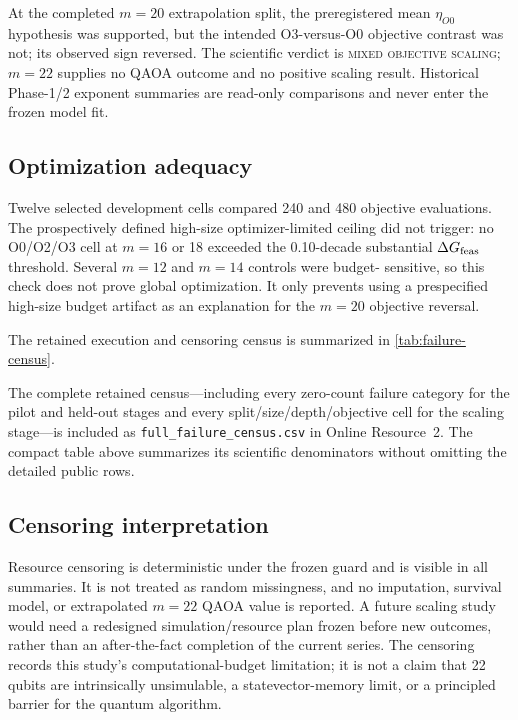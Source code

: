At the completed $m=20$ extrapolation split, the preregistered mean $\eta_{O0}$
hypothesis was supported, but the intended O3-versus-O0 objective contrast was
not; its observed sign reversed. The scientific verdict is
\textsc{mixed objective scaling}; $m=22$ supplies no QAOA outcome and no
positive scaling result. Historical Phase-1/2 exponent summaries are read-only
comparisons and never enter the frozen model fit.

\subsection{Optimization adequacy}

Twelve selected development cells compared 240 and 480 objective evaluations.
The prospectively defined high-size optimizer-limited ceiling did not trigger:
no O0/O2/O3 cell at $m=16$ or 18 exceeded the 0.10-decade substantial
$\Delta G_{\mathrm{feas}}$ threshold. Several $m=12$ and $m=14$ controls were budget-
sensitive, so this check does not prove global optimization. It only prevents
using a prespecified high-size budget artifact as an explanation for the
$m=20$ objective reversal.

The retained execution and censoring census is summarized in
\cref{tab:failure-census}.


The complete retained census---including every zero-count failure category for
the pilot and held-out stages and every split/size/depth/objective cell for the
scaling stage---is included as
\texttt{full\_failure\_census.csv} in Online Resource~2. The compact table above
summarizes its scientific denominators without omitting the detailed public
rows.

\subsection{Censoring interpretation}

Resource censoring is deterministic under the frozen guard and is visible in
all summaries. It is not treated as random missingness, and no imputation,
survival model, or extrapolated $m=22$ QAOA value is reported. A future scaling
study would need a redesigned simulation/resource plan frozen before new
outcomes, rather than an after-the-fact completion of the current series.
The censoring records this study's computational-budget limitation; it is not
a claim that 22 qubits are intrinsically unsimulable, a statevector-memory
limit, or a principled barrier for the quantum algorithm.
